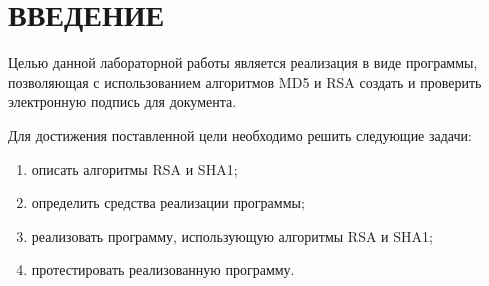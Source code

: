 \chapter*{ВВЕДЕНИЕ}


Целью данной лабораторной работы является реализация в виде программы, позволяющая с использованием алгоритмов MD5 и RSA создать и проверить электронную подпись для документа.

Для достижения поставленной цели необходимо решить следующие задачи:
\begin{enumerate}
	\item описать алгоритмы RSA и SHA1;
	\item определить средства реализации программы;
	\item реализовать программу, использующую алгоритмы RSA и SHA1;
	\item протестировать реализованную программу.
\end{enumerate}